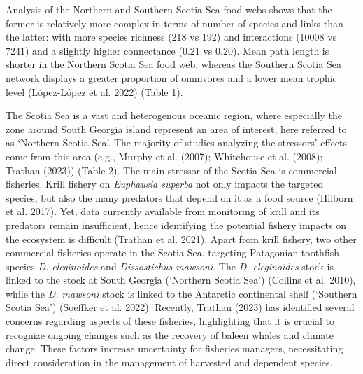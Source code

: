 \documentclass[
]{article}
\begin{document}
Analysis of the Northern and Southern Scotia Sea food webs shows that
the former is relatively more complex in terms of number of species and
links than the latter: with more species richness (218 vs 192) and
interactions (10008 vs 7241) and a slightly higher connectance (0.21 vs
0.20). Mean path length is shorter in the Northern Scotia Sea food web,
whereas the Southern Scotia Sea network displays a greater proportion of
omnivores and a lower mean trophic level (López-López et al. 2022)
(Table 1).

The Scotia Sea is a vast and heterogenous oceanic region, where
especially the zone around South Georgia island represent an area of
interest, here referred to as `Northern Scotia Sea'. The majority of
studies analyzing the stressors' effects come from this area (e.g.,
Murphy et al. (2007); Whitehouse et al. (2008); Trathan (2023)) (Table
2). The main stressor of the Scotia Sea is commercial fisheries. Krill
fishery on \emph{Euphausia superba} not only impacts the targeted
species, but also the many predators that depend on it as a food source
(Hilborn et al. 2017). Yet, data currently available from monitoring of
krill and its predators remain insufficient, hence identifying the
potential fishery impacts on the ecosystem is difficult (Trathan et al.
2021). Apart from krill fishery, two other commercial fisheries operate
in the Scotia Sea, targeting Patagonian toothfish species \emph{D.
eleginoides} and \emph{Dissostichus mawsoni}. The \emph{D. eleginoides}
stock is linked to the stock at South Georgia (`Northern Scotia Sea')
(Collins et al. 2010), while the \emph{D. mawsoni} stock is linked to
the Antarctic continental shelf (`Southern Scotia Sea') (Soeffker et al.
2022). Recently, Trathan (2023) has identified several concerns
regarding aspects of these fisheries, highlighting that it is crucial to
recognize ongoing changes such as the recovery of baleen whales and
climate change. These factors increase uncertainty for fisheries
managers, necessitating direct consideration in the management of
harvested and dependent species.
\end{document}
